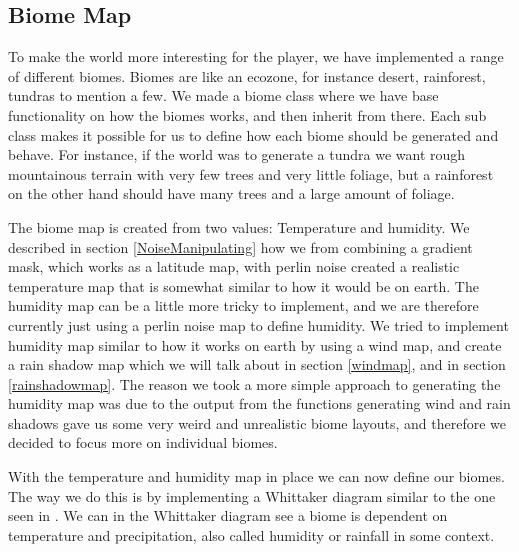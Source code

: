 \subsection{Biome Map}

To make the world more interesting for the player, we have implemented a range of different biomes. Biomes are like an ecozone, for instance desert, rainforest, tundras to mention a few. We made a biome class where we have base functionality on how the biomes works, and then inherit from there. Each sub class makes it possible for us to define how each biome should be generated and behave. For instance, if the world was to generate a tundra we want rough mountainous terrain with very few trees and very little foliage, but a rainforest on the other hand should have many trees and a large amount of foliage.

The biome map is created from two values: Temperature and humidity. We described in section \ref{NoiseManipulating} how we from combining a gradient mask, which works as a latitude map, with perlin noise created a realistic temperature map that is somewhat similar to how it would be on earth. The humidity map can be a little more tricky to implement, and we are therefore currently just using a perlin noise map to define humidity. We tried to implement humidity map similar to how it works on earth by using a wind map, and create a rain shadow map which we will talk about in section \ref{windmap}, and in section \ref{rainshadowmap}. The reason we took a more simple approach to generating the humidity map was due to the output from the functions generating wind and rain shadows gave us some very weird and unrealistic biome layouts, and therefore we decided to focus more on individual biomes.

With the temperature and humidity map in place we can now define our biomes. The way we do this is by implementing a Whittaker diagram similar to the one seen in . We can in the Whittaker diagram see a biome is dependent on temperature and precipitation, also called humidity or rainfall in some context.

